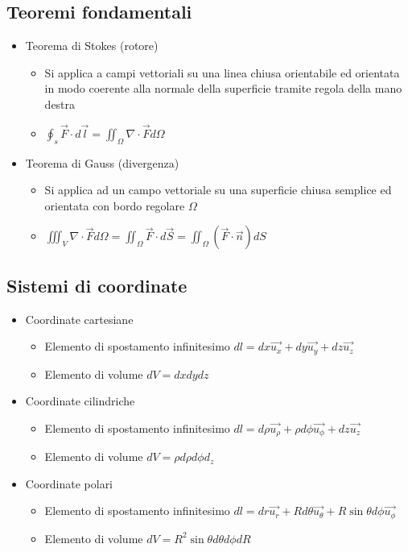 \documentclass{article}
\begin{document}
\newpage 

\subsection{Teoremi fondamentali}
\begin{itemize}
	\item Teorema di Stokes (rotore)
	\begin{itemize}
		\item Si applica a campi vettoriali su una linea chiusa orientabile ed orientata in modo coerente alla normale della superficie tramite regola della mano destra
		\item \( \displaystyle \oint_s \vec{F} \cdot d\vec{l} = \iint_\Omega \nabla \cdot \vec{F} d\Omega \)
	\end{itemize}	 
	\item Teorema di Gauss (divergenza)
	\begin{itemize}
		\item Si applica ad un campo vettoriale su una superficie chiusa semplice ed orientata con bordo regolare \( \Omega \)
		\item \( \displaystyle \iiint_V \nabla \cdot \vec{F} d\Omega = \iint_\Omega \vec{F} \cdot d\vec{S} = \iint_\Omega \left( \vec{F} \cdot \vec{n} \right) dS \)
	\end{itemize}
\end{itemize}

\subsection{Sistemi di coordinate}
\begin{itemize}
	\item Coordinate cartesiane
	\begin{itemize}
		\item Elemento di spostamento infinitesimo \( dl = dx \vec{u_x} + dy \vec{u_y} + dz \vec{u_z} \)
		\item Elemento di volume \( dV = dx dy dz \)
	\end{itemize}
	
	\item Coordinate cilindriche
	\begin{itemize}
		\item Elemento di spostamento infinitesimo \( dl = d\rho \vec{u_\rho} + \rho d\phi \vec{u_\phi} + dz \vec{u_z} \)
		\item Elemento di volume \( dV = \rho d\rho d\phi d_z\)
	\end{itemize}
	
	\item Coordinate polari
	\begin{itemize}
		\item Elemento di spostamento infinitesimo \( dl = dr \vec{u_r} + R d\theta \vec{u_\theta} + R \sin\theta d\phi \vec{u_\phi} \)
		\item Elemento di volume \( dV = R^2 \sin\theta d\theta d\phi dR \)
	\end{itemize}
\end{itemize}
\end{document}
